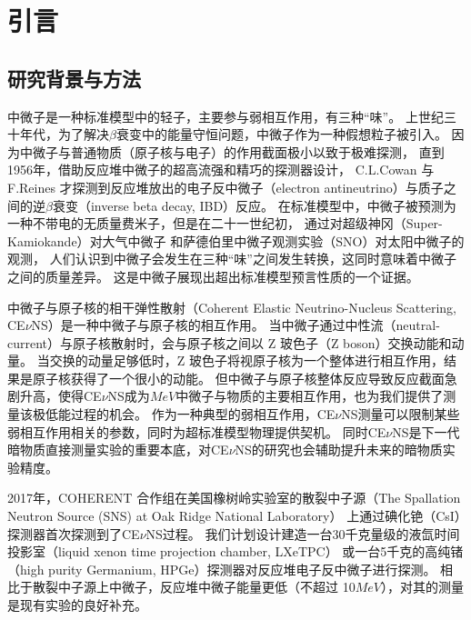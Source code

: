 
\chapter{引言}

\section{研究背景与方法}

中微子是一种标准模型中的轻子，主要参与弱相互作用，有三种``味''。
上世纪三十年代，为了解决$\beta$衰变中的能量守恒问题，中微子作为一种假想粒子被引入。
因为中微子与普通物质（原子核与电子）的作用截面极小以致于极难探测，
直到1956年，借助反应堆中微子的超高流强和精巧的探测器设计，
C.L.Cowan 与 F.Reines 才探测到反应堆放出的电子反中微子（electron antineutrino）与质子之间的逆$\beta$衰变（inverse beta decay, IBD）反应\cite{cowan_detection_1956}。
在标准模型中，中微子被预测为一种不带电的无质量费米子，但是在二十一世纪初，
通过对超级神冈（Super-Kamiokande）\cite{collaboration_evidence_1998}对大气中微子
和萨德伯里中微子观测实验（SNO）\cite{sno_collaboration_direct_2002}对太阳中微子的观测，
人们认识到中微子会发生在三种``味''之间发生转换，这同时意味着中微子之间的质量差异。
这是中微子展现出超出标准模型预言性质的一个证据。

中微子与原子核的相干弹性散射（Coherent Elastic Neutrino-Nucleus Scattering, CE$\nu$NS）是一种中微子与原子核的相互作用。
当中微子通过中性流（neutral-current）与原子核散射时，会与原子核之间以 Z 玻色子（Z boson）交换动能和动量。
当交换的动量足够低时，Z 玻色子将视原子核为一个整体进行相互作用，结果是原子核获得了一个很小的动能。
但中微子与原子核整体反应导致反应截面急剧升高，使得CE$\nu$NS成为$\si{MeV}$中微子与物质的主要相互作用，也为我们提供了测量该极低能过程的机会。
作为一种典型的弱相互作用，CE$\nu$NS测量可以限制某些弱相互作用相关的参数，同时为超标准模型物理提供契机。
同时CE$\nu$NS是下一代暗物质直接测量实验的重要本底\cite{ohare_fog_2021}，对CE$\nu$NS的研究也会辅助提升未来的暗物质实验精度。

2017年，COHERENT 合作组在美国橡树岭实验室的散裂中子源（The Spallation Neutron Source (SNS) at Oak Ridge National Laboratory）
上通过碘化铯（CsI）探测器首次探测到了CE$\nu$NS过程。
我们计划设计建造一台30千克量级的液氙时间投影室（liquid xenon time projection chamber, LXeTPC）
或一台5千克的高纯锗（high purity Germanium, HPGe）探测器对反应堆电子反中微子进行探测。
相比于散裂中子源上中微子，反应堆中微子能量更低（不超过 10$\si{MeV}$），对其的测量是现有实验的良好补充。

